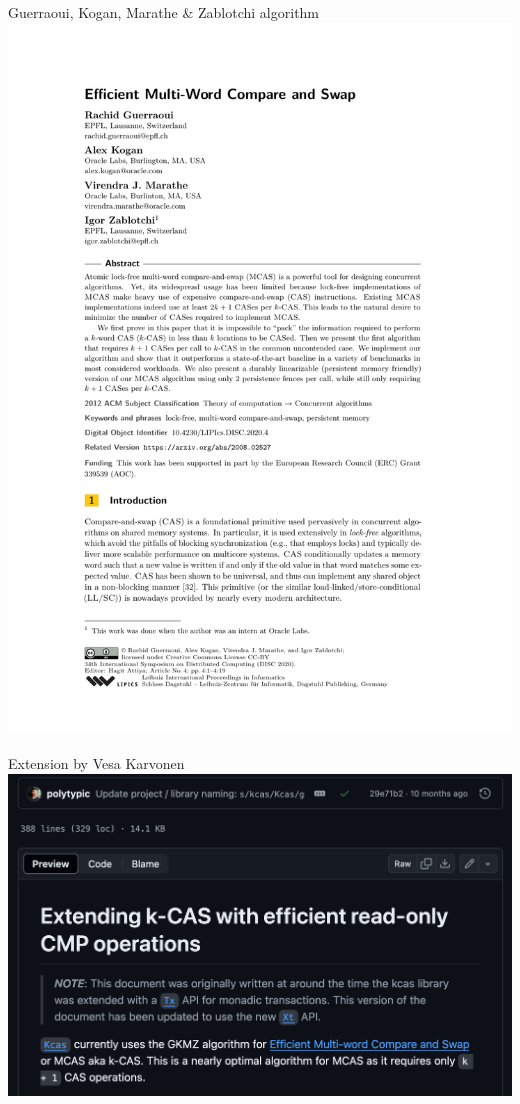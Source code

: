 \begin{frame}{Guerraoui, Kogan, Marathe \& Zablotchi algorithm}
\centering
\includegraphics[scale=0.5]{images/guerraoui_kogan_marathe_zablotchi_2020.pdf}
\end{frame}


\begin{frame}{Extension by Vesa Karvonen}
\centering
\includegraphics[scale=0.4]{images/gkmz-with-read-only-cmp-ops.png}
\end{frame}